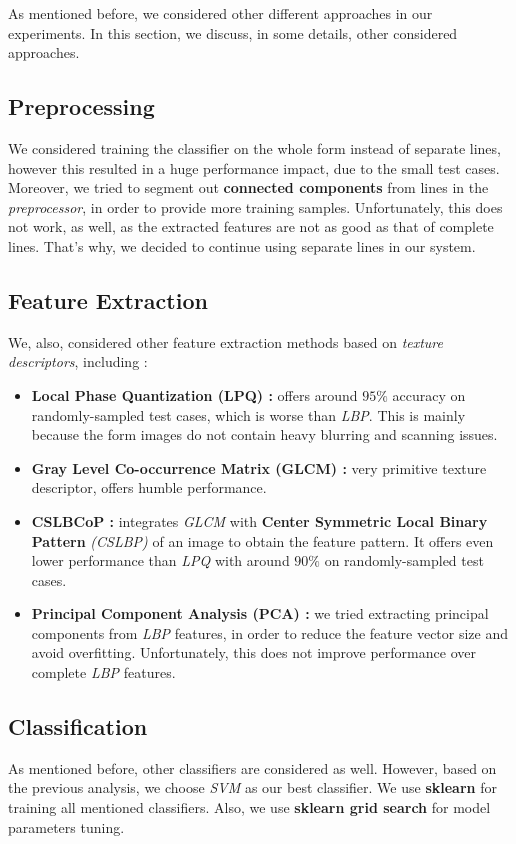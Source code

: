 As mentioned before, we considered other different approaches in our experiments. In this section, we discuss, in some details, other considered approaches.

\subsection{Preprocessing}
We considered training the classifier on the whole form instead of separate lines, however this resulted in a huge performance impact, due to the small test cases. Moreover, we tried to segment out \textbf{connected components} from lines in the \emph{preprocessor}, in order to provide more training samples. Unfortunately, this does not work, as well, as the extracted features are not as good as that of complete lines. That's why, we decided to continue using separate lines in our system.

\subsection{Feature Extraction}
We, also, considered other feature extraction methods based on \emph{texture descriptors}, including :
\begin{itemize}
    \item \textbf{Local Phase Quantization (LPQ) :} offers around $95\%$ accuracy on randomly-sampled test cases, which is worse than \emph{LBP}. This is mainly because the form images do not contain heavy blurring and scanning issues.
    \item \textbf{Gray Level Co-occurrence Matrix (GLCM) :} very primitive texture descriptor, offers humble performance.
    \item \textbf{CSLBCoP :} integrates \emph{GLCM} with \textbf{Center Symmetric Local Binary Pattern} \emph{(CSLBP)} of an image to obtain the feature pattern. It offers even lower performance than \emph{LPQ} with around $90\%$ on randomly-sampled test cases.
    \item \textbf{Principal Component Analysis (PCA) :} we tried extracting principal components from \emph{LBP} features, in order to reduce the feature vector size and avoid overfitting. Unfortunately, this does not improve performance over complete \emph{LBP} features.
\end{itemize}

\subsection{Classification}
As mentioned before, other classifiers are considered as well. However, based on the previous analysis, we choose \emph{SVM} as our best classifier. We use \textbf{sklearn} for training all mentioned classifiers. Also, we use \textbf{sklearn grid search} for model parameters tuning.

